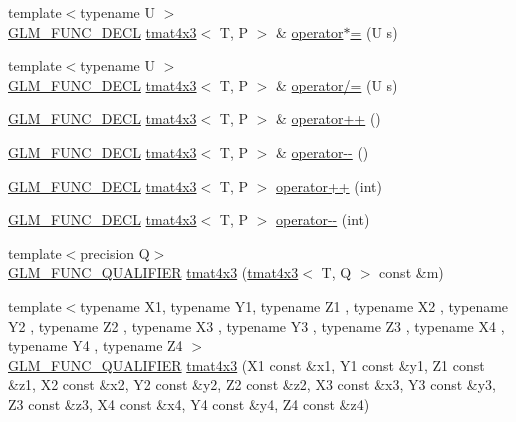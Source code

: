 \begin{DoxyCompactItemize}
\item 
{\footnotesize template$<$typename U $>$ }\\\hyperlink{setup_8hpp_ab2d052de21a70539923e9bcbf6e83a51}{G\+L\+M\+\_\+\+F\+U\+N\+C\+\_\+\+D\+E\+CL} \hyperlink{structglm_1_1detail_1_1tmat4x3}{tmat4x3}$<$ T, P $>$ \& \hyperlink{structglm_1_1detail_1_1tmat4x3_aa0414419a047b76b18eb96110d207cf3}{operator$\ast$=} (U s)
\item 
{\footnotesize template$<$typename U $>$ }\\\hyperlink{setup_8hpp_ab2d052de21a70539923e9bcbf6e83a51}{G\+L\+M\+\_\+\+F\+U\+N\+C\+\_\+\+D\+E\+CL} \hyperlink{structglm_1_1detail_1_1tmat4x3}{tmat4x3}$<$ T, P $>$ \& \hyperlink{structglm_1_1detail_1_1tmat4x3_a62e93a547d93d5f3d962d9af8e6ad9d7}{operator/=} (U s)
\item 
\hyperlink{setup_8hpp_ab2d052de21a70539923e9bcbf6e83a51}{G\+L\+M\+\_\+\+F\+U\+N\+C\+\_\+\+D\+E\+CL} \hyperlink{structglm_1_1detail_1_1tmat4x3}{tmat4x3}$<$ T, P $>$ \& \hyperlink{structglm_1_1detail_1_1tmat4x3_aa43e9bf0fae76220a4acd8a37a7a2a6a}{operator++} ()
\item 
\hyperlink{setup_8hpp_ab2d052de21a70539923e9bcbf6e83a51}{G\+L\+M\+\_\+\+F\+U\+N\+C\+\_\+\+D\+E\+CL} \hyperlink{structglm_1_1detail_1_1tmat4x3}{tmat4x3}$<$ T, P $>$ \& \hyperlink{structglm_1_1detail_1_1tmat4x3_a9142d63a4f237f74fd5cc23a40f03453}{operator-\/-\/} ()
\item 
\hyperlink{setup_8hpp_ab2d052de21a70539923e9bcbf6e83a51}{G\+L\+M\+\_\+\+F\+U\+N\+C\+\_\+\+D\+E\+CL} \hyperlink{structglm_1_1detail_1_1tmat4x3}{tmat4x3}$<$ T, P $>$ \hyperlink{structglm_1_1detail_1_1tmat4x3_a90dedf83f52b14d6b533aafd568f27d3}{operator++} (int)
\item 
\hyperlink{setup_8hpp_ab2d052de21a70539923e9bcbf6e83a51}{G\+L\+M\+\_\+\+F\+U\+N\+C\+\_\+\+D\+E\+CL} \hyperlink{structglm_1_1detail_1_1tmat4x3}{tmat4x3}$<$ T, P $>$ \hyperlink{structglm_1_1detail_1_1tmat4x3_ad1aa81d8abbe5ee270d0ad6b90b12899}{operator-\/-\/} (int)
\item 
{\footnotesize template$<$precision Q$>$ }\\\hyperlink{setup_8hpp_a33fdea6f91c5f834105f7415e2a64407}{G\+L\+M\+\_\+\+F\+U\+N\+C\+\_\+\+Q\+U\+A\+L\+I\+F\+I\+ER} \hyperlink{structglm_1_1detail_1_1tmat4x3_a75a5dd17c1376eaaf218a98be462222d}{tmat4x3} (\hyperlink{structglm_1_1detail_1_1tmat4x3}{tmat4x3}$<$ T, Q $>$ const \&m)
\item 
{\footnotesize template$<$typename X1, typename Y1, typename Z1 , typename X2 , typename Y2 , typename Z2 , typename X3 , typename Y3 , typename Z3 , typename X4 , typename Y4 , typename Z4 $>$ }\\\hyperlink{setup_8hpp_a33fdea6f91c5f834105f7415e2a64407}{G\+L\+M\+\_\+\+F\+U\+N\+C\+\_\+\+Q\+U\+A\+L\+I\+F\+I\+ER} \hyperlink{structglm_1_1detail_1_1tmat4x3_a8b97a242c1d393f68f96995318bb0247}{tmat4x3} (X1 const \&x1, Y1 const \&y1, Z1 const \&z1, X2 const \&x2, Y2 const \&y2, Z2 const \&z2, X3 const \&x3, Y3 const \&y3, Z3 const \&z3, X4 const \&x4, Y4 const \&y4, Z4 const \&z4)

\end{DoxyCompactItemize}
